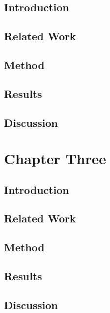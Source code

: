 \documentclass[letterpaper]{tandon_thesis}
\begin{document}
\section{Introduction}\label{sec:ChapTwoIntroduction}


\section{Related Work}\label{sec:ChapTwoMotivation}


\section{Method}\label{sec:ChapTwoMethod}


\section{Results}\label{sec:ChapTwoResults}


\section{Discussion}\label{sec:ChapTwoDiscussion}



\chapter{Chapter Three}
\label{ch-3}

\section{Introduction}\label{sec:ChapThreeIntroduction}


\section{Related Work}\label{sec:ChapThreeMotivation}


\section{Method}\label{sec:ChapThreeMethod}


\section{Results}\label{sec:ChapThreeResults}


\section{Discussion}\label{sec:ChapThreeDiscussion} 




{\singlespace
\printbibliography}
\end{document}
